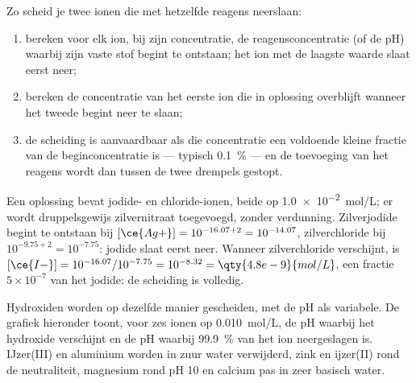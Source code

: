 \begin{method}\label{met:b1:precipitation:selective}
Zo scheid je twee ionen die met hetzelfde reagens neerslaan:
\begin{enumerate}
  \item bereken voor elk ion, bij zijn concentratie, de
        reagensconcentratie (of de pH) waarbij zijn vaste stof begint te
        ontstaan; het ion met de laagste waarde slaat eerst neer;
  \item bereken de concentratie van het eerste ion die in oplossing
        overblijft wanneer het tweede begint neer te slaan;
  \item de scheiding is aanvaardbaar als die concentratie een voldoende
        kleine fractie van de beginconcentratie is --- typisch
        \qty{0.1}{\percent} --- en de toevoeging van het reagens wordt dan
        tussen de twee drempels gestopt.
\end{enumerate}
\end{method}

\begin{example}\label{ex:b1:precipitation:i-cl}
Een oplossing bevat jodide- en chloride-ionen, beide op
\qty{1.0e-2}{mol/L}; er wordt druppelsgewijs zilvernitraat toegevoegd,
zonder verdunning. Zilverjodide begint te ontstaan bij $[\ce{Ag+}] = 10^{-16.07 + 2} =
10^{-14.07}$, zilverchloride bij $10^{-9.75 + 2} = 10^{-7.75}$: jodide
slaat eerst neer. Wanneer zilverchloride verschijnt, is
$[\ce{I-}] = 10^{-16.07}/10^{-7.75} = 10^{-8.32} = \qty{4.8e-9}{mol/L}$,
een fractie $5 \times 10^{-7}$ van het jodide: de scheiding is volledig.
\end{example}

Hydroxiden worden op dezelfde manier gescheiden, met de pH als
variabele. De grafiek hieronder toont, voor zes ionen op
\qty{0.010}{mol/L}, de pH waarbij het hydroxide verschijnt en de pH
waarbij \qty{99.9}{\percent} van het ion neergeslagen is. IJzer(III) en
aluminium worden in zuur water verwijderd, zink en ijzer(II) rond de
neutraliteit, magnesium rond pH 10 en calcium pas in zeer basisch
water.

